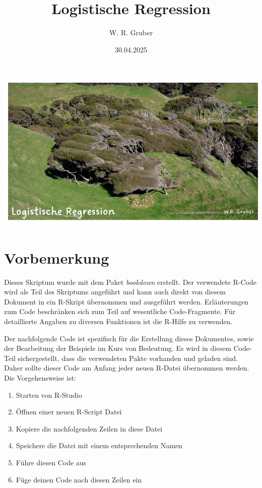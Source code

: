\documentclass[
]{article}
\title{Logistische Regression}
\author{W. R. Gruber}
\date{30.04.2025}
\providecommand{\tightlist}{%
  \setlength{\itemsep}{0pt}\setlength{\parskip}{0pt}}
\begin{document}
\maketitle

{
\setcounter{tocdepth}{2}
\tableofcontents
}
\section{}\label{section}

\includegraphics[width=1\textwidth,height=\textheight]{Images/Cover.png}

\section*{Vorbemerkung}\label{vorbemerkung}

Dieses Skriptum wurde mit dem Paket \emph{bookdown} erstellt. Der verwendete R-Code wird als Teil des Skriptums angeführt und kann auch direkt von diesem Dokument in ein R-Skript übernommen und ausgeführt werden. Erläuterungen zum Code beschränken sich zum Teil auf wesentliche Code-Fragmente. Für detaillierte Angaben zu diversen Funktionen ist die R-Hilfe zu verwenden.

Der nachfolgende Code ist spezifisch für die Erstellung dieses Dokumentes, sowie der Bearbeitung der Beispiele im Kurs von Bedeutung. Es wird in diesem Code-Teil sichergestellt, dass die verwendeten Pakte vorhanden und geladen sind. Daher sollte dieser Code am Anfang jeder neuen R-Datei übernommen werden. Die Vorgehensweise ist:

\begin{enumerate}
\def\labelenumi{\arabic{enumi}.}
\tightlist
\item
  Starten von R-Studio
\item
  Öffnen einer neuen R-Script Datei
\item
  Kopiere die nachfolgenden Zeilen in diese Datei
\item
  Speichere die Datei mit einem entsprechenden Namen
\item
  Führe diesen Code aus
\item
  Füge deinen Code nach diesen Zeilen ein
\end{enumerate}
\end{document}
